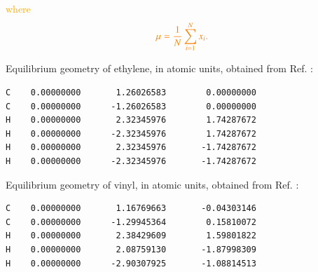 \documentclass[aip,jcp,preprint,noshowkeys,superscriptaddress]{revtex4-1}
\newcommand{\fk}[1]{\textcolor{orange}{#1}}
\begin{document}
\fk{where}
\begin{equation}
	\fk{\mu = \frac{1}{N} \sum_{i=1}^{N} x_i.}
\end{equation}


Equilibrium geometry of ethylene, in atomic units, obtained from Ref. :
\begin{singlespace}
\begin{verbatim}
C    0.00000000       1.26026583        0.00000000
C    0.00000000      -1.26026583        0.00000000
H    0.00000000       2.32345976        1.74287672
H    0.00000000      -2.32345976        1.74287672
H    0.00000000       2.32345976       -1.74287672
H    0.00000000      -2.32345976       -1.74287672
\end{verbatim}
\end{singlespace}

Equilibrium geometry of vinyl, in atomic units, obtained from Ref. :
\begin{singlespace}
\begin{verbatim}
C    0.00000000       1.16769663       -0.04303146
C    0.00000000      -1.29945364        0.15810072
H    0.00000000       2.38429609        1.59801822
H    0.00000000       2.08759130       -1.87998309
H    0.00000000      -2.90307925       -1.08814513
\end{verbatim}
\end{singlespace}

\clearpage

\end{document}

